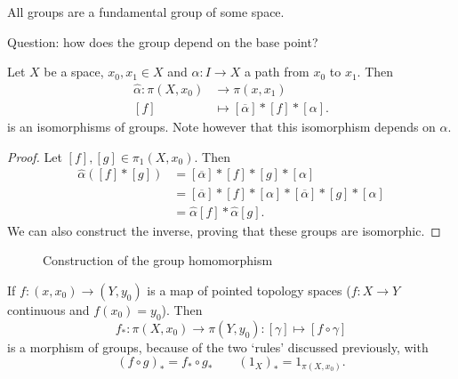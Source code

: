 \begin{remark}
    All groups are a fundamental group of some space.
\end{remark}

Question: how does the group depend on  the base point?

\begin{theorem}[52.1]
    Let $X$ be a space, $x_0, x_1 \in X$ and $\alpha: I \to X$ a path from  $x_0$ to $x_1$.
    Then
    \begin{align*}
        \hat{\alpha}: \pi(X, x_0) &\longrightarrow\pi(x, x_1)\\
        [f] &\longmapsto  [\overline{\alpha}] * [f] * [\alpha]
    .\end{align*}
    is an isomorphisms of groups. Note however that this isomorphism depends on $\alpha$.
\end{theorem}
\begin{proof}
    Let $[f], [g] \in \pi_1(X, x_0)$.
    Then 
    \begin{align*}
        \hat{\alpha}([f]*[g]) &= [\overline{\alpha}] * [f] * [g] * [\alpha]\\
                              &= [\overline{\alpha}] *[f] * [\alpha] * [\overline{\alpha}] * [g] * [\alpha]\\
                              &= \hat{\alpha}[f] * \hat{\alpha}[g]
    .\end{align*}
    We can also construct the inverse, proving that these groups are isomorphic.
\end{proof}

\begin{figure}[ht]
    \centering
    \caption{Construction of the group homomorphism}
    \label{fig:dependence-of-base-point}
\end{figure}
\begin{remark}
    If $f: (x, x_0) \to (Y, y_0)$ is a map of pointed topology spaces ($f: X \to Y$ continuous and $f(x_0) = y_0$).
    Then \[
        f_*:\pi(X, x_0) \to  \pi(Y, y_0): [\gamma] \mapsto [f  \circ \gamma]
    \]
    is a morphism of groups, because of the two `rules' discussed previously, with
    \[
        (f \circ g)_* = f_*  \circ g_* \qquad (1_X)_* = 1_{\pi(X, x_0)}
    .\] 
\end{remark}
